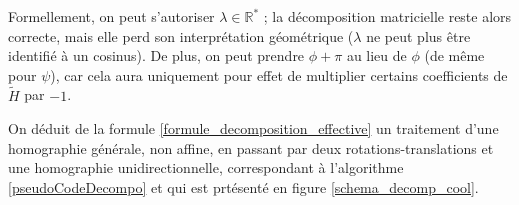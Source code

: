  Formellement, on peut s'autoriser $\lambda \in \mathbb R^*$ ; la décomposition matricielle reste alors correcte, mais elle perd son interprétation géométrique ($\lambda$ ne peut plus être identifié à un cosinus). De plus, on peut prendre $\phi + \pi$ au lieu de $\phi$ (de même pour $\psi$), car cela aura uniquement pour effet de multiplier certains coefficients de $\tilde H$ par $-1$.
 
 On déduit de la formule \ref{formule_decomposition_effective} un traitement d'une homographie générale, non affine, en passant par deux rotations-translations et une homographie unidirectionnelle, correspondant à l'algorithme \ref{pseudoCodeDecompo} et qui est prtésenté en figure \ref{schema_decomp_cool}.
 \label{ref_schema_decomp_cool}
		
	\begin{figure}
		\centering
		\\

\end{figure}
